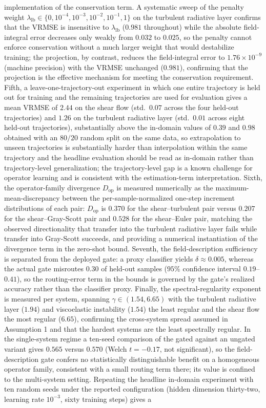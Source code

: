 \documentclass[preprint,12pt]{elsarticle}
\begin{document}
implementation of the conservation term. A systematic sweep of the penalty weight $\lambda_{\mathrm{lb}}\in\{0,10^{-4},10^{-3},10^{-2},10^{-1},1\}$ on the turbulent radiative layer confirms that the VRMSE is insensitive to $\lambda_{\mathrm{lb}}$ ($0.981$ throughout) while the absolute field-integral error decreases only weakly from $0.032$ to $0.025$, so the penalty cannot enforce conservation without a much larger weight that would destabilize training; the projection, by contrast, reduces the field-integral error to $1.76\times10^{-9}$ (machine precision) with the VRMSE unchanged ($0.981$), confirming that the projection is the effective mechanism for meeting the conservation requirement. Fifth, a leave-one-trajectory-out experiment in which one entire trajectory is held out for training and the remaining trajectories are used for evaluation gives a mean VRMSE of $2.44$ on the shear flow (std.\ $0.07$ across the four held-out trajectories) and $1.26$ on the turbulent radiative layer (std.\ $0.01$ across eight held-out trajectories), substantially above the in-domain values of $0.39$ and $0.98$ obtained with an $80/20$ random split on the same data, so extrapolation to unseen trajectories is substantially harder than interpolation within the same trajectory and the headline evaluation should be read as in-domain rather than trajectory-level generalization; the trajectory-level gap is a known challenge for operator learning and is consistent with the estimation-term interpretation. Sixth, the operator-family divergence $D_{\mathrm{op}}$ is measured numerically as the maximum-mean-discrepancy between the per-sample-normalized one-step increment distributions of each pair: $D_{\mathrm{op}}$ is $0.370$ for the shear--turbulent pair versus $0.207$ for the shear--Gray-Scott pair and $0.528$ for the shear--Euler pair, matching the observed directionality that transfer into the turbulent radiative layer fails while transfer into Gray-Scott succeeds, and providing a numerical instantiation of the divergence term in the zero-shot bound. Seventh, the field-description sufficiency is separated from the deployed gate: a proxy classifier yields $\delta\approx0.005$, whereas the actual gate misroutes $0.30$ of held-out samples ($95\%$ confidence interval $0.19$--$0.41$), so the routing-error term in the bounds is governed by the gate's realized accuracy rather than the classifier proxy. Finally, the spectral-regularity exponent is measured per system, spanning $\gamma\in(1.54,6.65)$ with the turbulent radiative layer ($1.94$) and viscoelastic instability ($1.54$) the least regular and the shear flow the most regular ($6.65$), confirming the cross-system spread assumed in Assumption 1 and that the hardest systems are the least spectrally regular. In the single-system regime a ten-seed comparison of the gated against an ungated variant gives $0.565$ versus $0.570$ (Welch $t=-0.17$, not significant), so the field-description gate confers no statistically distinguishable benefit on a homogeneous operator family, consistent with a small routing term there; its value is confined to the multi-system setting. Repeating the headline in-domain experiment with ten random seeds under the reported configuration (hidden dimension thirty-two, learning rate $10^{-3}$, sixty training steps) gives a 
\end{document}
